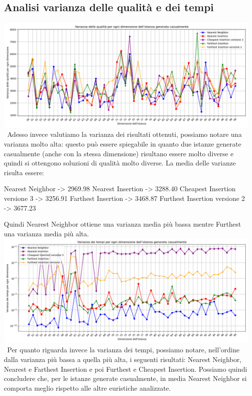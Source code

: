 \documentclass[a4paper,12pt]{report}
\begin{document}
\subsection{Analisi varianza delle qualità e dei tempi}
\includegraphics[width=1\textwidth]{../Grafici/22.png} \
Adesso invece valutiamo la varianza dei risultati ottenuti, possiamo notare una varianza molto alta: questo può essere spiegabile in quanto due istanze generate casualmente (anche con la stessa dimensione) risultano essere molto diverse e quindi si ottengono soluzioni di qualità molto diverse. La media delle varianze risulta essere:
\begin{myverbatim}
Nearest Neighbor ->              2969.98
Nearest Insertion ->             3288.40
Cheapest Insertion versione 3 -> 3256.91
Farthest Insertion ->            3468.87
Furthest Insertion versione 2 -> 3677.23
\end{myverbatim}
Quindi Nearest Neighbor ottiene una varianza media più bassa mentre Furthest una varianza media più alta. \newline
\includegraphics[width=1\textwidth]{../Grafici/23.png} \
Per quanto riguarda invece la varianza dei tempi, possiamo notare, nell'ordine dalla varianza più bassa a quella più alta, i seguenti risultati: Nearest Neighbor, Nearest e Farthest Insertion e poi Furthest e Cheapest Insertion. \newline
Possiamo quindi concludere che, per le istanze generate casualmente, in media Nearest Neighbor si comporta meglio rispetto alle altre euristiche analizzate.
\end{document}
